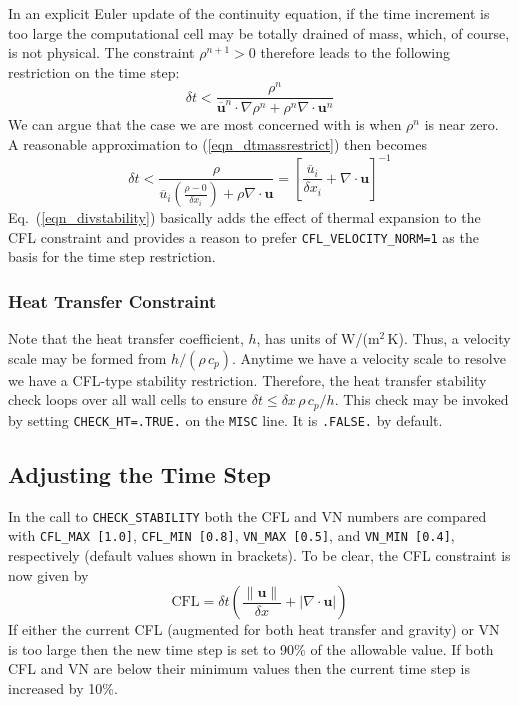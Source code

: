 \documentclass[11pt]{book}
\newcommand{\ct}{\tt\small}
\newcommand{\be}{\begin{equation}}
\newcommand{\ee}{\end{equation}}
\begin{document}
In an explicit Euler update of the continuity equation, if the time increment is too large the computational cell may be totally drained of mass, which, of course, is not physical. The constraint $\rho^{n+1}>0$ therefore leads to the following restriction on the time step:
\begin{equation}
\label{eqn_dtmassrestrict}
\delta t < \frac{\rho^n}{\overline{\mathbf{u}}^n\cdot\nabla\rho^n + \rho^n \nabla\cdot\mathbf{u}^n}
\end{equation}
We can argue that the case we are most concerned with is when $\rho^n$ is near zero.  A reasonable approximation to (\ref{eqn_dtmassrestrict}) then becomes
\be
\label{eqn_divstability}
\delta t < \frac{\rho}{\overline{u}_i \left(\frac{\rho-0}{\delta x_i}\right) + \rho \nabla\cdot\mathbf{u}}
  = \left[ \frac{\overline{u}_i}{\delta x_i} + \nabla\cdot\mathbf{u} \right]^{-1}
\ee
Eq.~(\ref{eqn_divstability}) basically adds the effect of thermal expansion to the CFL constraint and provides a reason to prefer {\ct CFL\_VELOCITY\_NORM=1}
as the basis for the time step restriction.

\subsubsection{Heat Transfer Constraint}

Note that the heat transfer coefficient, $h$, has units of W/(m$^2$\,K).  Thus, a velocity scale may be formed from $h/(\rho\, c_p)$.
Anytime we have a velocity scale to resolve we have a CFL-type stability restriction.
Therefore, the heat transfer stability check loops over all wall cells to ensure $\delta t \le \delta x \,\rho \,c_p/h$.
This check may be invoked by setting {\ct CHECK\_HT=.TRUE.} on the {\ct MISC} line. It is {\ct .FALSE.} by default.


\subsection{Adjusting the Time Step}

In the call to {\ct CHECK\_STABILITY} both the CFL and VN numbers are compared with {\ct CFL\_MAX [1.0]}, {\ct CFL\_MIN [0.8]}, {\ct VN\_MAX [0.5]},
and {\ct VN\_MIN [0.4]}, respectively (default values shown in brackets).  To be clear, the CFL constraint is now given by
\begin{equation}
\mbox{CFL} = \delta t \left( \frac{\|\mathbf{u}\|}{\delta x} + |\nabla\cdot\mathbf{u}| \right)
\end{equation}
If either the current CFL (augmented for both heat transfer and gravity) or VN is too large then the new time step is set to 90\% of the allowable value.
If both CFL and VN are below their minimum values then the current time step is increased by 10\%.
\end{document}
